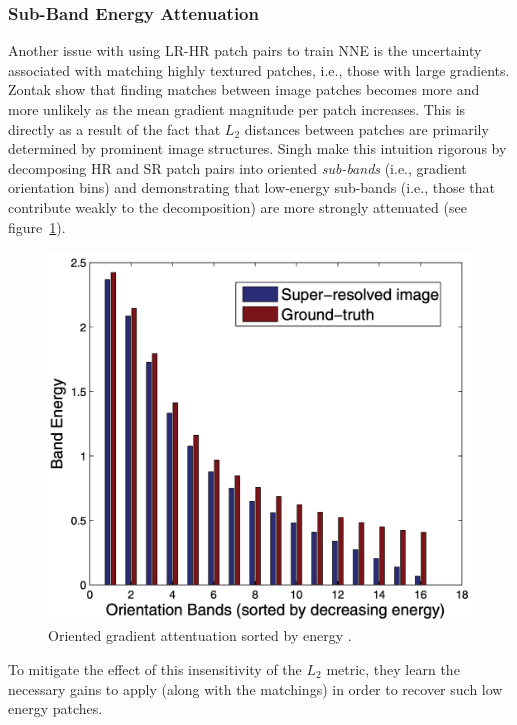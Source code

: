 \subsubsection{Sub-Band Energy Attenuation}\label{subsubsec:subband}
Another issue with using LR-HR patch pairs to train NNE is the uncertainty associated with matching highly textured patches, i.e., those with large gradients.
%
Zontak \etal \cite{zontak2011internal} show that finding matches between image patches becomes more and more unlikely as the mean gradient magnitude per patch increases.
%
This is directly as a result of the fact that \(L_2\) distances between patches are primarily determined by prominent image structures.
%
Singh \etal \cite{singh2014} make this intuition rigorous by decomposing HR and SR patch pairs into oriented \textit{sub-bands} (i.e., gradient orientation bins) and demonstrating that low-energy sub-bands (i.e., those that contribute weakly to the decomposition) are more strongly attenuated (see figure~\ref{fig:subbands}).
\begin{figure}[!htbp]
    \centering
    \begin{adjustbox}{width=\linewidth}
        \centering
        \includegraphics{figures/classical/subbands.png}
    \end{adjustbox}
    \caption{Oriented gradient attentuation sorted by energy \cite{singh2014}.}\label{fig:subbands}
\end{figure}
To mitigate the effect of this insensitivity of the \(L_2\) metric, they learn the necessary gains to apply (along with the matchings) in order to recover such low energy patches.

